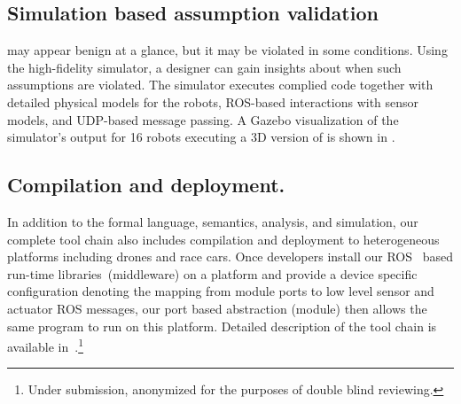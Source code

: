 \subsection{Simulation based assumption validation}

 may appear benign at a glance, but it may be violated in some conditions. Using the high-fidelity \lgname simulator, a designer can gain insights about when such assumptions are violated.
%
The simulator executes complied \lgname code together with detailed physical  models for the robots, ROS-based interactions with sensor models, and UDP-based message passing.
%
A Gazebo visualization of the simulator's output for 16 robots executing a 3D version of \LineForm is shown in .
%



\subsection{Compilation and deployment.}
In addition to the formal language, semantics, analysis, and simulation,
our complete tool chain also includes compilation and deployment to heterogeneous platforms including drones and race cars.
Once developers install our ROS~\cite{ros} based run-time libraries~(middleware) on a platform
and provide a device specific configuration denoting the mapping from \lgname module ports
to low level sensor and actuator ROS messages,
our port based abstraction (module) then allows the same \lgname program to run on this platform.
Detailed description of the tool chain is available in~\cite{ghosh2019cyphyhouse}.\footnote{Under submission, anonymized for the purposes of double blind reviewing.}
